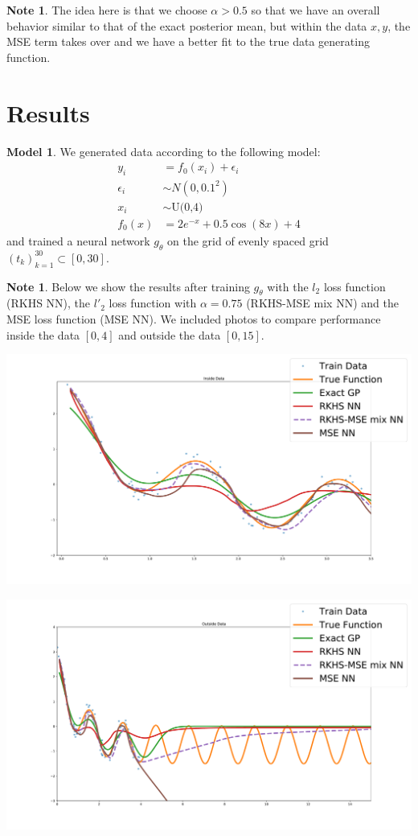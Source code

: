 \documentclass{article}
\theoremstyle{definition}
\newtheorem{note}[definition]{Note}
\newtheorem{modl}[definition]{Model}
\newcommand{\al}{\alpha}
\newcommand{\ep}{\epsilon}
\begin{document}
\begin{note}
The idea here is that we choose $\al > 0.5$ so that we have an overall behavior similar to that of the exact posterior mean, but within the data $x,y$, the MSE term takes over and we have a better fit to the true data generating function. 
\end{note}



\section{Results}

\begin{modl}
We generated data according to the following model:
\begin{align*}
y_i &= f_0(x_i) + \ep_i \\
\ep_i &\sim N(0, 0.1^2) \\
x_i & \sim \text{U(0,4)} \\
f_0(x) &= 2e^{-x} +  0.5 \cos(8x) + 4
\end{align*}
and trained a neural network $g_{\theta}$ on the grid of evenly spaced grid $(t_k)_{k=1}^{30} \subset [0,30]$.
\end{modl}

\begin{note}
Below we show the results after training $g_{\theta}$ with the $l_2$ loss function (RKHS NN), the $l'_2$ loss function with $\al = 0.75$ (RKHS-MSE mix NN) and the MSE loss function (MSE NN). We included photos to compare performance inside the data $[0,4]$ and outside the data $[0, 15]$. 
\end{note}


\includegraphics[scale=.35]{inside_data.pdf}



\includegraphics[scale=.35]{outside_data.pdf}
\end{document}
